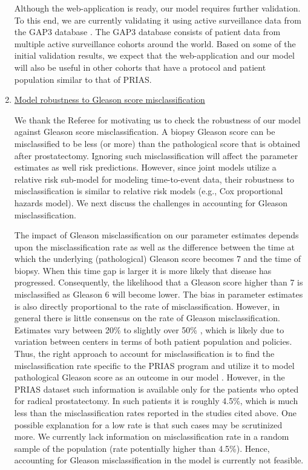 \begin{enumerate}
			Although the web-application is ready, our model requires further validation. To this end, we are currently validating it using active surveillance data from the GAP3 database \citep{bruinsma2018movember}. The GAP3 database consists of patient data from multiple active surveillance cohorts around the world. Based on some of the initial validation results, we expect that the web-application and our model will also be useful in other cohorts that have a protocol and patient population similar to that of PRIAS.

			\item \underline{Model robustness to Gleason score misclassification}

			We thank the Referee for motivating us to check the robustness of our model against Gleason score misclassification. A biopsy Gleason score can be misclassified to be less (or more) than the pathological score that is obtained after prostatectomy. Ignoring such misclassification will affect the parameter estimates as well risk predictions. However, since joint models utilize a relative risk sub-model for modeling time-to-event data, their robustness to misclassification is similar to relative risk models (e.g., Cox proportional hazards model). We next discuss the challenges in accounting for Gleason misclassification. 

			The impact of Gleason misclassification on our parameter estimates depends upon the misclassification rate as well as the difference between the time at which the underlying (pathological) Gleason score becomes 7 and the time of biopsy. When this time gap is larger it is more likely that disease has progressed. Consequently, the likelihood that a Gleason score higher than 7 is misclassified as Gleason 6 will become lower. The bias in parameter estimates is also directly proportional to the rate of misclassification. However, in general there is little consensus on the rate of Gleason misclassification. Estimates vary between 20\% to slightly over 50\% \citep{cookson1997, Ploussard2010,Lattouf2002, Melia2006, Pinthus2006}, which is likely due to variation between centers in terms of both patient population and policies. Thus, the right approach to account for misclassification is to find the misclassification rate specific to the PRIAS program and utilize it to model pathological Gleason score as an outcome in our model \citep{balasubramanian2003estimation, coley2017, meier2003discrete}. However, in the PRIAS dataset such information is available only for the patients who opted for radical prostatectomy. In such patients it is roughly 4.5\%, which is much less than the misclassification rates reported in the studies cited above. One possible explanation for a low rate is that such cases may be scrutinized more. We currently lack information on misclassification rate in a random sample of the population (rate potentially higher than 4.5\%). Hence, accounting for Gleason misclassification in the model is currently not feasible. 


\end{enumerate}
